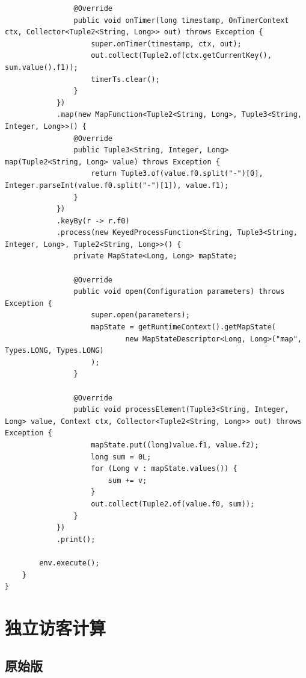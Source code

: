 \documentclass[cn,11pt,chinese]{elegantbook}
\begin{document}
\begin{verbatim}
                @Override
                public void onTimer(long timestamp, OnTimerContext ctx, Collector<Tuple2<String, Long>> out) throws Exception {
                    super.onTimer(timestamp, ctx, out);
                    out.collect(Tuple2.of(ctx.getCurrentKey(), sum.value().f1));
                    timerTs.clear();
                }
            })
            .map(new MapFunction<Tuple2<String, Long>, Tuple3<String, Integer, Long>>() {
                @Override
                public Tuple3<String, Integer, Long> map(Tuple2<String, Long> value) throws Exception {
                    return Tuple3.of(value.f0.split("-")[0], Integer.parseInt(value.f0.split("-")[1]), value.f1);
                }
            })
            .keyBy(r -> r.f0)
            .process(new KeyedProcessFunction<String, Tuple3<String, Integer, Long>, Tuple2<String, Long>>() {
                private MapState<Long, Long> mapState;

                @Override
                public void open(Configuration parameters) throws Exception {
                    super.open(parameters);
                    mapState = getRuntimeContext().getMapState(
                            new MapStateDescriptor<Long, Long>("map", Types.LONG, Types.LONG)
                    );
                }

                @Override
                public void processElement(Tuple3<String, Integer, Long> value, Context ctx, Collector<Tuple2<String, Long>> out) throws Exception {
                    mapState.put((long)value.f1, value.f2);
                    long sum = 0L;
                    for (Long v : mapState.values()) {
                        sum += v;
                    }
                    out.collect(Tuple2.of(value.f0, sum));
                }
            })
            .print();

        env.execute();
    }
}

\end{verbatim}

\section{独立访客计算}

\subsection{原始版}
\end{document}
